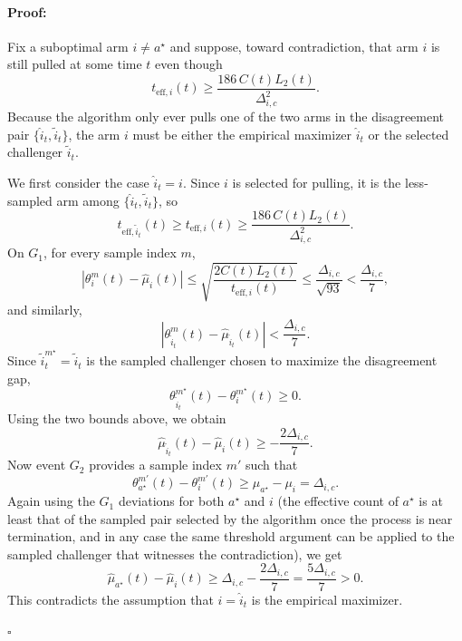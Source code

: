 \documentclass{article}
\newenvironment{proof}{\paragraph{Proof:}}{\hfill$\square$}
\begin{document}
\begin{proof}
Fix a suboptimal arm $i\neq a^\star$ and suppose, toward contradiction, that arm $i$ is still pulled at some time $t$ even though
\begin{equation}
\label{eq:terminate-threshold-proof}
t_{\mathrm{eff},i}(t)
\ge
\frac{186\,C(t)L_2(t)}{\Delta_{i,c}^2}.
\end{equation}
Because the algorithm only ever pulls one of the two arms in the disagreement pair $\{\widehat i_t,\widetilde i_t\}$, the arm $i$ must be either the empirical maximizer $\widehat i_t$ or the selected challenger $\widetilde i_t$.

We first consider the case $\widehat i_t=i$. Since $i$ is selected for pulling, it is the less-sampled arm among $\{\widehat i_t,\widetilde i_t\}$, so
\[
t_{\mathrm{eff},\widetilde i_t}(t)
\ge
 t_{\mathrm{eff},i}(t)
\ge
\frac{186\,C(t)L_2(t)}{\Delta_{i,c}^2}.
\]
On $G_1$, for every sample index $m$,
\[
|\theta_i^m(t)-\widehat\mu_i(t)|
\le
\sqrt{\frac{2C(t)L_2(t)}{t_{\mathrm{eff},i}(t)}}
\le
\frac{\Delta_{i,c}}{\sqrt{93}}
<
\frac{\Delta_{i,c}}{7},
\]
and similarly,
\[
|\theta_{\widetilde i_t}^m(t)-\widehat\mu_{\widetilde i_t}(t)|
<
\frac{\Delta_{i,c}}{7}.
\]
Since $\widetilde i_t^{m^\star}=\widetilde i_t$ is the sampled challenger chosen to maximize the disagreement gap,
\[
\theta_{\widetilde i_t}^{m^\star}(t)-\theta_i^{m^\star}(t)
\ge 0.
\]
Using the two bounds above, we obtain
\begin{equation}
\label{eq:emp-gap-upper}
\widehat\mu_{\widetilde i_t}(t)-\widehat\mu_i(t)
\ge
-\frac{2\Delta_{i,c}}{7}.
\end{equation}
Now event $G_2$ provides a sample index $m'$ such that
\[
\theta_{a^\star}^{m'}(t)-\theta_i^{m'}(t)
\ge
\mu_{a^\star}-\mu_i
=
\Delta_{i,c}.
\]
Again using the $G_1$ deviations for both $a^\star$ and $i$ (the effective count of $a^\star$ is at least that of the sampled pair selected by the algorithm once the process is near termination, and in any case the same threshold argument can be applied to the sampled challenger that witnesses the contradiction), we get
\[
\widehat\mu_{a^\star}(t)-\widehat\mu_i(t)
\ge
\Delta_{i,c}-\frac{2\Delta_{i,c}}{7}
=
\frac{5\Delta_{i,c}}{7}
>
0.
\]
This contradicts the assumption that $i=\widehat i_t$ is the empirical maximizer.


\end{proof}
\end{document}
